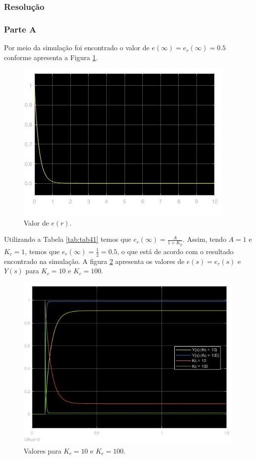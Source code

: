 \documentclass[
]{book}
\theoremstyle{definition}
\theoremstyle{definition}
\theoremstyle{definition}
\theoremstyle{remark}
\begin{document}
\hypertarget{resoluuxe7uxe3o}{%
\subsubsection*{Resolução}\label{resoluuxe7uxe3o}}

\hypertarget{parte-a}{%
\subsubsection*{Parte A}\label{parte-a}}

Por meio da simulação foi encontrado o valor de \(e(\infty) = e_r(\infty) = 0.5\) conforme apresenta a Figura \ref{fig:fig41A1}.

\begin{figure}
\includegraphics[width=0.8\linewidth]{Imagens/Lab4/Resolução/prob1A1} \caption{Valor de $e(r)$.}\label{fig:fig41A1}
\end{figure}

Utilizando a Tabela \ref{tab:tab41} temos que \(e_r(\infty)=\frac{A}{1 + K_p}\). Assim, tendo \(A = 1\) e \(K_c = 1\), temos que \(e_r(\infty) = \frac {1}{2} = 0.5\), o que está de acordo com o resultado encontrado na simulação. A figura \ref{fig:fig41A2} apresenta os valores de \(e(s) = e_r(s)\) e \(Y(s)\) para \(K_c = 10\) e \(K_c = 100\).

\begin{figure}
\includegraphics[width=0.8\linewidth]{Imagens/Lab4/Resolução/prob1A2} \caption{Valores para $K_c = 10$ e $K_c = 100$.}\label{fig:fig41A2}
\end{figure}
\end{document}
